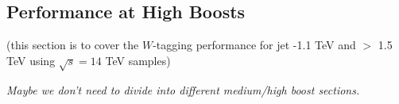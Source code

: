 


\subsection{Performance at High Boosts}

(this section is to cover the $W$-tagging performance for jet -1.1 TeV and
$>$ 1.5 TeV using $\sqrt{s} = 14$ TeV samples)

{\it Maybe we don't need to divide into different medium/high boost sections.}




